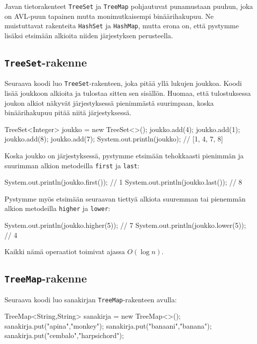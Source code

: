 Javan tietorakenteet \texttt{TreeSet} ja \texttt{TreeMap}
pohjautuvat punamustaan puuhun,
joka on AVL-puun tapainen mutta monimutkaisempi
binäärihakupuu.
Ne muistuttavat rakenteita \texttt{HashSet} ja \texttt{HashMap},
mutta erona on, että pystymme lisäksi etsimään
alkioita niiden järjestyksen perusteella.

\subsection{\texttt{TreeSet}-rakenne}

Seuraava koodi luo \texttt{TreeSet}-rakenteen,
joka pitää yllä lukujen joukkoa.
Koodi lisää joukkoon alkioita ja tulostaa sitten sen sisällön.
Huomaa, että tulostuksessa joukon alkiot näkyvät
järjestyksessä pienimmästä suurimpaan, koska
binäärihakupuu pitää niitä järjestyksessä.

\begin{code}
TreeSet<Integer> joukko = new TreeSet<>();
joukko.add(4);
joukko.add(1);
joukko.add(8);
joukko.add(7);
System.out.println(joukko); // [1, 4, 7, 8]
\end{code}

Koska joukko on järjestyksessä, pystymme etsimään tehokkaasti
pienim\-män ja suurimman alkion metodeilla \texttt{first} ja \texttt{last}:

\begin{code}
System.out.println(joukko.first()); // 1
System.out.println(joukko.last()); // 8
\end{code}

Pystymme myös etsimään seuraavan tiettyä alkiota
suuremman tai pienemmän alkion metodeilla \texttt{higher} ja \texttt{lower}:

\begin{code}
System.out.println(joukko.higher(5)); // 7
System.out.println(joukko.lower(5)); // 4
\end{code}

Kaikki nämä operaatiot toimivat ajassa $O(\log n)$.

\subsection{\texttt{TreeMap}-rakenne}

Seuraava koodi luo sanakirjan \texttt{TreeMap}-rakenteen avulla:

\begin{code}
TreeMap<String,String> sanakirja = new TreeMap<>();
sanakirja.put("apina","monkey");
sanakirja.put("banaani","banana");
sanakirja.put("cembalo","harpsichord");
\end{code}


